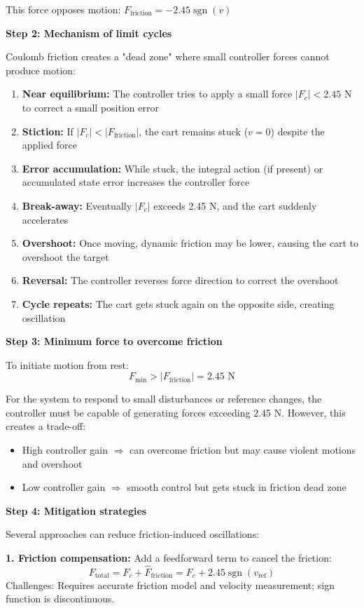 \documentclass[11pt,a4paper]{article}
\begin{document}
This force opposes motion: $F_{\text{friction}} = -2.45 \operatorname{sgn}(v)$

\textbf{Step 2: Mechanism of limit cycles}

Coulomb friction creates a "dead zone" where small controller forces cannot produce motion:

\begin{enumerate}
\item \textbf{Near equilibrium:} The controller tries to apply a small force $|F_c| < 2.45$ N to correct a small position error
\item \textbf{Stiction:} If $|F_c| < |F_{\text{friction}}|$, the cart remains stuck ($v = 0$) despite the applied force
\item \textbf{Error accumulation:} While stuck, the integral action (if present) or accumulated state error increases the controller force
\item \textbf{Break-away:} Eventually $|F_c|$ exceeds 2.45 N, and the cart suddenly accelerates
\item \textbf{Overshoot:} Once moving, dynamic friction may be lower, causing the cart to overshoot the target
\item \textbf{Reversal:} The controller reverses force direction to correct the overshoot
\item \textbf{Cycle repeats:} The cart gets stuck again on the opposite side, creating oscillation
\end{enumerate}

\textbf{Step 3: Minimum force to overcome friction}

To initiate motion from rest:
\[
F_{\text{min}} > |F_{\text{friction}}| = 2.45 \text{ N}
\]

For the system to respond to small disturbances or reference changes, the controller must be capable of generating forces exceeding 2.45 N. However, this creates a trade-off:
\begin{itemize}
\item High controller gain $\Rightarrow$ can overcome friction but may cause violent motions and overshoot
\item Low controller gain $\Rightarrow$ smooth control but gets stuck in friction dead zone
\end{itemize}

\textbf{Step 4: Mitigation strategies}

Several approaches can reduce friction-induced oscillations:

\textbf{1. Friction compensation:}
Add a feedforward term to cancel the friction:
\[
F_{\text{total}} = F_c + \hat{F}_{\text{friction}} = F_c + 2.45 \operatorname{sgn}(v_{\text{ref}})
\]
Challenges: Requires accurate friction model and velocity measurement; sign function is discontinuous.
\end{document}
